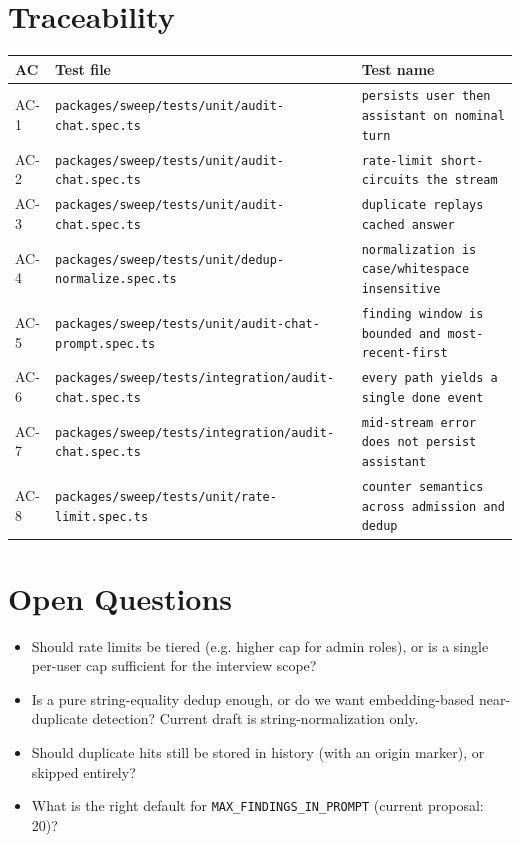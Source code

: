 \section{Traceability}

\begin{center}
\begin{tabular}{@{}lll@{}}
\toprule
AC & Test file & Test name \\
\midrule
AC-1 & \texttt{packages/sweep/tests/unit/audit-chat.spec.ts} & \texttt{persists user then assistant on nominal turn} \\
AC-2 & \texttt{packages/sweep/tests/unit/audit-chat.spec.ts} & \texttt{rate-limit short-circuits the stream} \\
AC-3 & \texttt{packages/sweep/tests/unit/audit-chat.spec.ts} & \texttt{duplicate replays cached answer} \\
AC-4 & \texttt{packages/sweep/tests/unit/dedup-normalize.spec.ts} & \texttt{normalization is case/whitespace insensitive} \\
AC-5 & \texttt{packages/sweep/tests/unit/audit-chat-prompt.spec.ts} & \texttt{finding window is bounded and most-recent-first} \\
AC-6 & \texttt{packages/sweep/tests/integration/audit-chat.spec.ts} & \texttt{every path yields a single done event} \\
AC-7 & \texttt{packages/sweep/tests/integration/audit-chat.spec.ts} & \texttt{mid-stream error does not persist assistant} \\
AC-8 & \texttt{packages/sweep/tests/unit/rate-limit.spec.ts} & \texttt{counter semantics across admission and dedup} \\
\bottomrule
\end{tabular}
\end{center}

\section{Open Questions}
\begin{itemize}[leftmargin=1.2em]
  \item Should rate limits be tiered (e.g. higher cap for admin roles), or is a single per-user cap sufficient for the interview scope?
  \item Is a pure string-equality dedup enough, or do we want embedding-based near-duplicate detection? Current draft is string-normalization only.
  \item Should duplicate hits still be stored in history (with an origin marker), or skipped entirely?
  \item What is the right default for \texttt{MAX\_FINDINGS\_IN\_PROMPT} (current proposal: 20)?
\end{itemize}


